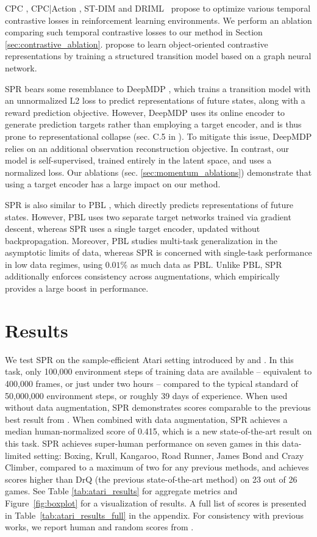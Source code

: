 CPC \citep{cpc}, CPC|Action \citep{guo2018neural}, ST-DIM \citep{stdim} and DRIML~\citep{mazoure2020deep} propose to optimize various temporal contrastive losses in reinforcement learning environments. We perform an ablation comparing such temporal contrastive losses to our method in Section \ref{sec:contrastive_ablation}. \cite{kipf2019contrastive} propose to learn object-oriented contrastive representations by training a structured transition model based on a graph neural network.

SPR bears some resemblance to DeepMDP \citep{deepMDP}, which trains a transition model with an unnormalized L2 loss to predict representations of future states, along with a reward prediction objective. However, DeepMDP uses its online encoder to generate prediction targets rather than employing a target encoder, and is thus prone to representational collapse (sec. C.5 in \cite{deepMDP}). To mitigate this issue, DeepMDP relies on an additional observation reconstruction objective. In contrast, our model is self-supervised, trained entirely in the latent space, and uses a normalized loss. Our ablations (sec. \ref{sec:momentum_ablations}) demonstrate that using a target encoder has a large impact on our method.

SPR is also similar to PBL \citep{pbl}, which directly predicts representations of future states. However, PBL uses two separate target networks trained via gradient descent, whereas SPR uses a single target encoder, updated without backpropagation. Moreover, PBL studies multi-task generalization in the asymptotic limits of data, whereas SPR is concerned with single-task performance in low data regimes, using $0.01\%$ as much data as PBL.  Unlike PBL, SPR additionally enforces consistency across augmentations, which empirically provides a large boost in performance.

\section{Results}

We test SPR on the sample-efficient Atari setting introduced by \cite{simple} and \cite{der}.  In this task, only 100,000 environment steps of training data are available -- equivalent to 400,000 frames, or just under two hours -- compared to the typical standard of 50,000,000 environment steps, or roughly 39 days of experience.  When used without data augmentation, SPR demonstrates scores comparable to the previous best result from \cite{drq}.  When combined with data augmentation, SPR achieves a median human-normalized score of 0.415, which is a new state-of-the-art result on this task.  SPR achieves super-human performance on seven games in this data-limited setting: Boxing, Krull, Kangaroo, Road Runner, James Bond and Crazy Climber, compared to a maximum of two for any previous methods, and achieves scores higher than DrQ (the previous state-of-the-art method) on 23 out of 26 games.  See Table \ref{tab:atari_results} for aggregate metrics and Figure~\ref{fig:boxplot} for a visualization of results.  A full list of scores is presented in Table~\ref{tab:atari_results_full} in the appendix.  For consistency with previous works, we report human and random scores from \cite{wang2016dueling}.

